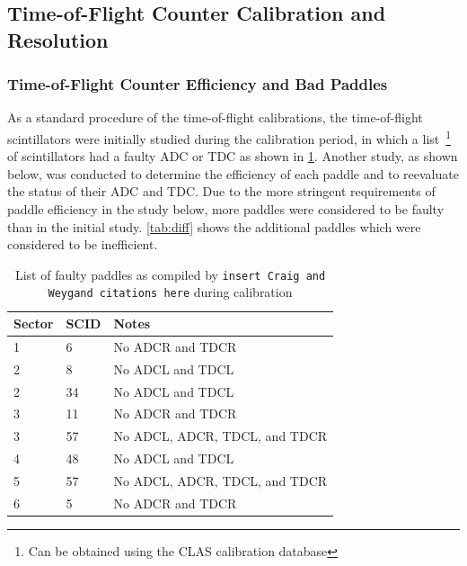 \subsection{\label{sec:calib.tof}Time-of-Flight Counter Calibration and Resolution}

\subsubsection{\label{sec:calib.tof.eff}Time-of-Flight Counter Efficiency and Bad Paddles}

As a standard procedure of the time-of-flight calibrations, the time-of-flight scintillators were initially studied during the calibration period, in which a list~\footnote{Can be obtained using the CLAS calibration database} of scintillators had a faulty ADC or TDC as shown in \ref{tab:craigtof}. Another study, as shown below, was conducted to determine the efficiency of each paddle and to reevaluate the status of their ADC and TDC. Due to the more stringent requirements of paddle efficiency in the study below, more paddles were considered to be faulty than in the initial study. \ref{tab:diff} shows the additional paddles which were considered to be inefficient.

\begin{table}
\begin{tabular}{l|l|p{}} %
Sector & SCID & Notes \\
\hline
1 & 6 & No ADCR and TDCR \\
2 & 8 & No ADCL and TDCL \\
2 & 34 & No ADCL and TDCL \\
3 & 11 & No ADCR and TDCR \\
3 & 57 & No ADCL, ADCR, TDCL, and TDCR \\
4 & 48 & No ADCL and TDCL \\
5 & 57 & No ADCL, ADCR, TDCL, and TDCR \\
6 & 5 & No ADCR and TDCR

\end{tabular}
    \caption{List of faulty paddles as compiled by \texttt{insert Craig and Weygand citations here} during calibration}
    \label{tab:craigtof}
\end{table}

